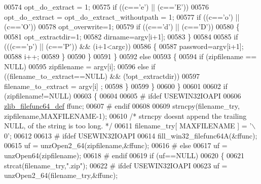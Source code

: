 \begin{DoxyCode}
{{{{{{{{{{{{{{{{{{{{00574                         opt\_do\_extract = 1;
00575                     \textcolor{keywordflow}{if} ((c==\textcolor{charliteral}{'e'}) || (c==\textcolor{charliteral}{'E'}))
00576                         opt\_do\_extract = opt\_do\_extract\_withoutpath = 1;
00577                     \textcolor{keywordflow}{if} ((c==\textcolor{charliteral}{'o'}) || (c==\textcolor{charliteral}{'O'}))
00578                         opt\_overwrite=1;
00579                     \textcolor{keywordflow}{if} ((c==\textcolor{charliteral}{'d'}) || (c==\textcolor{charliteral}{'D'}))
00580                     \{
00581                         opt\_extractdir=1;
00582                         dirname=argv[i+1];
00583                     \}
00584 
00585                     \textcolor{keywordflow}{if} (((c==\textcolor{charliteral}{'p'}) || (c==\textcolor{charliteral}{'P'})) && (i+1<argc))
00586                     \{
00587                         password=argv[i+1];
00588                         i++;
00589                     \}
00590                 \}
00591             \}
00592             \textcolor{keywordflow}{else}
00593             \{
00594                 \textcolor{keywordflow}{if} (zipfilename == NULL)
00595                     zipfilename = argv[i];
00596                 \textcolor{keywordflow}{else} \textcolor{keywordflow}{if} ((filename\_to\_extract==NULL) && (!opt\_extractdir))
00597                         filename\_to\_extract = argv[i] ;
00598             \}
00599         \}
00600     \}
00601 
00602     \textcolor{keywordflow}{if} (zipfilename!=NULL)
00603     \{
00604 
00605 \textcolor{preprocessor}{#        ifdef USEWIN32IOAPI}
00606         \hyperlink{structzlib__filefunc64__def__s}{zlib\_filefunc64\_def} ffunc;
00607 \textcolor{preprocessor}{#        endif}
00608 
00609         strncpy(filename\_try, zipfilename,MAXFILENAME-1);
00610         \textcolor{comment}{/* strncpy doesnt append the trailing NULL, of the string is too long. */}
00611         filename\_try[ MAXFILENAME ] = \textcolor{charliteral}{'\(\backslash\)0'};
00612 
00613 \textcolor{preprocessor}{#        ifdef USEWIN32IOAPI}
00614         fill\_win32\_filefunc64A(&ffunc);
00615         uf = unzOpen2\_64(zipfilename,&ffunc);
00616 \textcolor{preprocessor}{#        else}
00617         uf = unzOpen64(zipfilename);
00618 \textcolor{preprocessor}{#        endif}
00619         \textcolor{keywordflow}{if} (uf==NULL)
00620         \{
00621             strcat(filename\_try,\textcolor{stringliteral}{".zip"});
00622 \textcolor{preprocessor}{#            ifdef USEWIN32IOAPI}
00623             uf = unzOpen2\_64(filename\_try,&ffunc);
}}}}}}}}}}}}}}}}}}}}
\end{DoxyCode}
